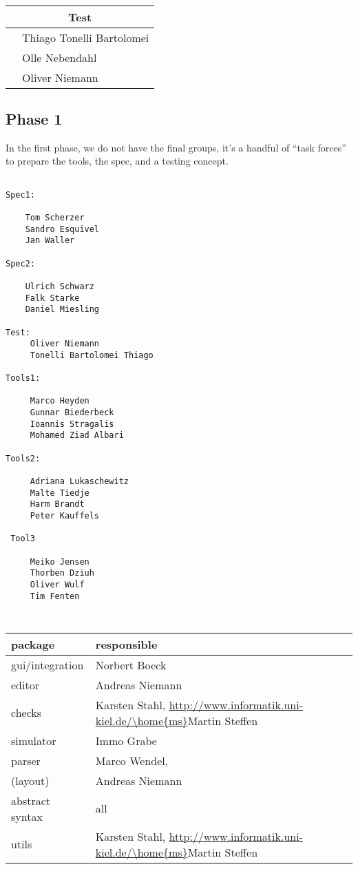 \\[4em]
\begin{tabular}{|l|p{8cm}|}
  \hline
  \multicolumn{2}{|c|}{Test}
  \\\hline\hline
   & 
   Thiago Tonelli Bartolomei
   \\
   &Olle Nebendahl
   \\
   &
   Oliver Niemann
  \\\hline
\end{tabular}




\subsection*{Phase 1}

In the first phase, we do not have the final groups, it's a handful of
``task forces'' to prepare the tools, the spec, and a testing concept.

\begin{verbatim}

Spec1:

    Tom Scherzer
    Sandro Esquivel
    Jan Waller 

Spec2:

    Ulrich Schwarz 
    Falk Starke 
    Daniel Miesling

Test:
     Oliver Niemann 
     Tonelli Bartolomei Thiago

Tools1:

     Marco Heyden 
     Gunnar Biederbeck
     Ioannis Stragalis 
     Mohamed Ziad Albari

Tools2:

     Adriana Lukaschewitz
     Malte Tiedje 
     Harm Brandt
     Peter Kauffels 

 Tool3

     Meiko Jensen
     Thorben Dziuh 
     Oliver Wulf 
     Tim Fenten


\end{verbatim}

\iffalse



\begin{table}[htbp]
  \centering
  \begin{tabular}[t]{l@{\quad\quad}l}
     package  &  responsible
     \\\hline
     gui/integration & Norbert Boeck
     \\
     editor & Andreas Niemann
     \\
     checks & 
     Karsten Stahl,
     \url{http://www.informatik.uni-kiel.de/\home{ms}}{Martin Steffen}
     \\
     simulator & Immo Grabe
     \\
     parser & Marco Wendel,
     \\
     (layout) & Andreas Niemann
     \\
     abstract syntax & all
     \\
     utils 
     &
     Karsten Stahl,
     \url{http://www.informatik.uni-kiel.de/\home{ms}}{Martin Steffen}
  \end{tabular}
  \caption{}
  \label{tab:gruppen}
\end{table}




